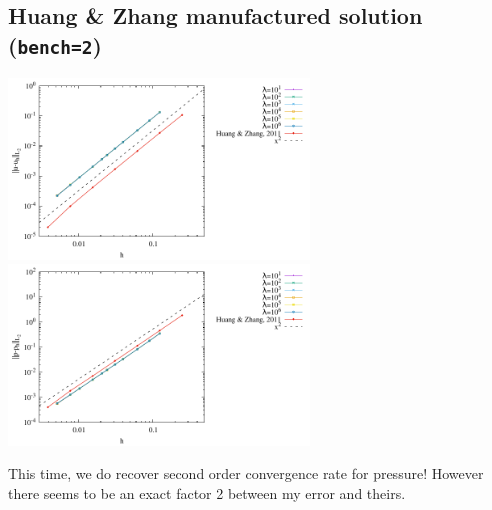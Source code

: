 \subsection*{Huang \& Zhang manufactured solution ({\tt bench=2})}

\begin{center}
\includegraphics[width=8cm]{python_codes/fieldstone_161/results/bench2/errorsV.pdf}
\includegraphics[width=8cm]{python_codes/fieldstone_161/results/bench2/errorsP.pdf}\\
\end{center}

This time, we do recover second order convergence rate for pressure!
However there seems to be an exact factor 2 between my error and theirs.


